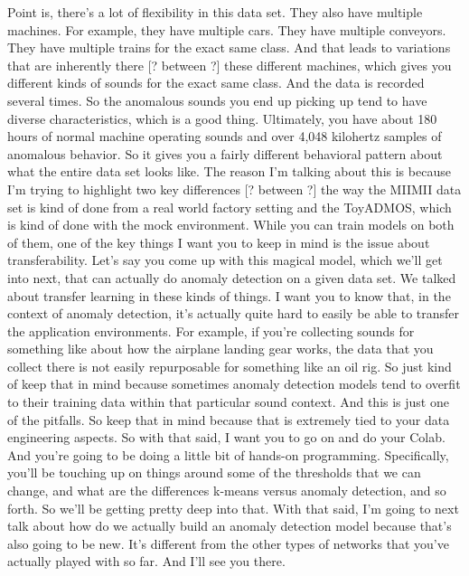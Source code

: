  Point is, there's a lot of flexibility in this data set.
  They also have multiple machines.
  For example, they have multiple cars.
  They have multiple conveyors.
  They have multiple trains for the exact same class.
  And that leads to variations that are inherently there
  [? between ?] these different machines, which
  gives you different kinds of sounds for the exact same class.
  And the data is recorded several times.
  So the anomalous sounds you end up picking up
  tend to have diverse characteristics, which is a good thing.
  Ultimately, you have about 180 hours of normal machine operating sounds
  and over 4,048 kilohertz samples of anomalous behavior.
  So it gives you a fairly different behavioral pattern
  about what the entire data set looks like.
  The reason I'm talking about this is because I'm
  trying to highlight two key differences [? between ?] the way
  the MIIMII data set is kind of done from a real world factory
  setting and the ToyADMOS, which is kind of done with the mock environment.
  While you can train models on both of them,
  one of the key things I want you to keep in mind
  is the issue about transferability.
  Let's say you come up with this magical model,
  which we'll get into next, that can actually do
  anomaly detection on a given data set.
  We talked about transfer learning in these kinds of things.
  I want you to know that, in the context of anomaly detection,
  it's actually quite hard to easily be able to transfer the application
  environments.
  For example, if you're collecting sounds for something
  like about how the airplane landing gear works,
  the data that you collect there is not easily repurposable for something
  like an oil rig.
  So just kind of keep that in mind because sometimes anomaly detection
  models tend to overfit to their training data
  within that particular sound context.
  And this is just one of the pitfalls.
  So keep that in mind because that is extremely
  tied to your data engineering aspects.
  So with that said, I want you to go on and do your Colab.
  And you're going to be doing a little bit of hands-on programming.
  Specifically, you'll be touching up on things around some of the thresholds
  that we can change, and what are the differences
  k-means versus anomaly detection, and so forth.
  So we'll be getting pretty deep into that.
  With that said, I'm going to next talk about how do we
  actually build an anomaly detection model
  because that's also going to be new.
  It's different from the other types of networks
  that you've actually played with so far.
  And I'll see you there.
  
